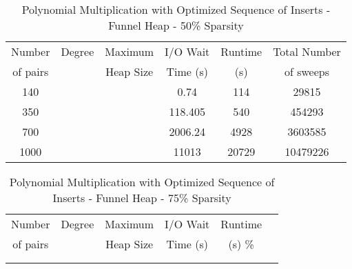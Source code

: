 \documentclass[11pt, one-sided]{amsart}
\begin{document}
\begin{table}[htbp]
   \centering
      \caption{Polynomial Multiplication with Optimized Sequence of Inserts - Funnel Heap - 50\% Sparsity}
   \begin{tabular}{|c|c|c|c|c|c|}
   	\hline
		 Number   & 	Degree	& Maximum 	& I/O Wait		&  Runtime 	& Total Number	\\ 
		 of pairs 	&			& Heap Size	& Time (s)		&	(s)	 	& of sweeps		\\ \hline
		 140		&			&			&	0.74		&	114		&	29815		\\
		 350		&			&			&	118.405	&	540		&	454293		\\
		 700		&			&			&	2006.24	&	4928		&	3603585		\\
		1000		&			&			&      11013	&	20729	&	10479226		\\
	\hline
   \end{tabular}
   \label{tab:booktabs}
\end{table}


\begin{table}[htbp]
   \centering
      \caption{Polynomial Multiplication with Optimized Sequence of Inserts - Funnel Heap - 75\% Sparsity}
   \begin{tabular}{|c|c|c|c|c|c|}
   	\hline
		 Number   & 	Degree	& Maximum & I/O Wait		& Runtime 	 \\ 
		 of pairs 	&			& Heap Size	& Time (s)		&	(s)		 		\%				\\ \hline
		 		&			&			&			&						\\
		 		&			&			&			&						\\
   \end{tabular}
   \label{tab:booktabs}
\end{table}



\newpage

\end{document}
